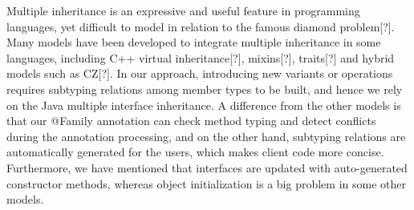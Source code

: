 Multiple inheritance is an expressive and useful feature in programming languages, yet difficult to model in relation to the famous diamond problem[?].
Many models have been developed to integrate multiple inheritance in some languages, including C++ virtual inheritance[?], mixins[?], traits[?] and
hybrid models such as CZ[?]. In our approach, introducing new variants or operations requires subtyping relations among member types to be built, and
hence we rely on the Java multiple interface inheritance. A difference from the other models is that our \textsf{@Family} annotation can check method
typing and detect conflicts during the annotation processing, and on the other hand, subtyping relations are automatically generated for the users, which
makes client code more concise. Furthermore, we have mentioned that interfaces are updated with auto-generated constructor methods, whereas object initialization is a big problem in some other models.
